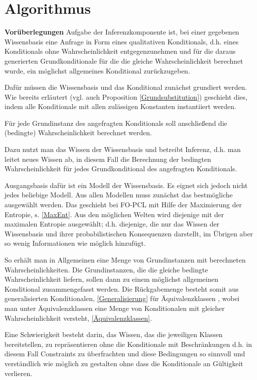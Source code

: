 \documentclass[a4paper, 11pt]{book}
\begin{document}
\chapter{Algorithmus} \label{Alg}

\textbf{Vorüberlegungen}
Aufgabe der Inferenzkomponente ist, bei einer gegebenen Wissensbasis eine Anfrage in Form eines qualitativen Konditionals, d.h. eines Konditionals ohne Wahrscheinlichkeit entgegenzunehmen und für die daraus generierten Grundkonditionale für die die gleiche Wahrscheinlichkeit berechnet wurde, ein möglichst allgemeines Konditional zurückzugeben.

Dafür müssen die Wissensbasis und das Konditional zunächst grundiert werden. Wie bereits erläutert (vgl. auch Proposition \ref{Grundsubstitution}) geschieht dies, indem alle Konditionale mit allen zulässigen Konstanten instantiiert werden.

Für jede Grundinstanz des angefragten Konditionals soll anschließend die (bedingte) Wahrscheinlichkeit berechnet werden.

Dazu nutzt man das Wissen der Wissensbasis und betreibt Inferenz, d.h. man leitet neues Wissen ab,  in diesem Fall die Berechnung der bedingten Wahrscheinlichkeit für jedes Grundkonditional des angefragten Konditionals.

Ausgangsbasis dafür ist ein Modell der Wissensbasis. Es eignet sich jedoch nicht jedes beliebige Modell. Aus allen Modellen muss zunächst das bestmögliche ausgewählt werden.
Das geschieht bei FO-PCL mit Hilfe der Maximierung der Entropie, s. \ref{MaxEnt}. Aus den möglichen Welten wird diejenige mit der maximalen Entropie ausgewählt; d.h. diejenige, die nur das Wissen der Wissensbasis und ihrer probabilistischen Konsequenzen darstellt, im Übrigen aber so wenig Informationen wie möglich hinzufügt.

So erhält man in Allgemeinen eine Menge von Grundinstanzen mit berechneten Wahrscheinlichkeiten.
Die Grundinstanzen, die die gleiche bedingte Wahrscheinlichkeit liefern, sollen dann zu einem möglichst allgemeinen Konditional zusammengefasst werden. Die Rückgabemenge besteht somit aus generalisierten Konditionalen, \ref{Generalisierung} für Äquivalenzklassen  , wobei man unter Äquivalenzklassen eine Menge von Konditionalen mit gleicher Wahrscheinlichkeit versteht, \ref{Äquivalenzklassen}. 

Eine Schwierigkeit besteht darin, das Wissen, das die jeweiligen Klassen bereitstellen, zu repräsentieren ohne die Konditionale mit Beschränkungen d.h. in diesem Fall Constraints zu überfrachten und diese Bedingungen so sinnvoll und verständlich wie möglich zu gestalten ohne dass die Konditionale an Gültigkeit verlieren.
\end{document}
